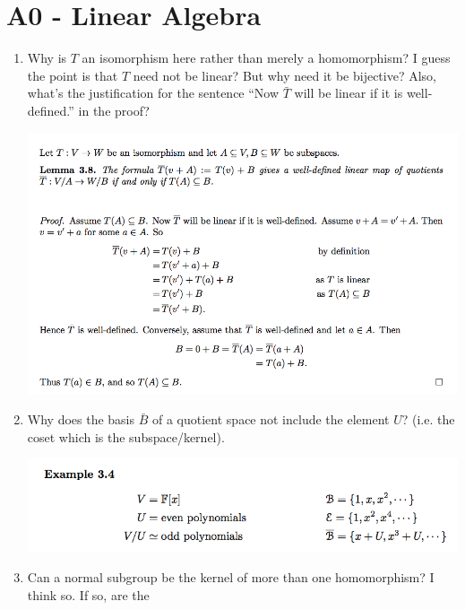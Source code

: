 \documentclass[12pt]{article}
\begin{document}
\section{A0 - Linear Algebra}
\begin{enumerate}
\item Why is $T$ an isomorphism here rather than merely a homomorphism? I guess the point is that
  $T$ need not be linear? But why need it be bijective? Also, what's the justification for the
  sentence ``Now $\bar T$ will be linear if it is well-defined.'' in the proof?
  \begin{mdframed}
    \includegraphics[width=400pt]{img/question-linear-algebra-a0-induced-map-well-defined-theorem.png}
  \end{mdframed}
\item Why does the basis $\bar B$ of a quotient space not include the element $U$? (i.e. the coset
  which is the subspace/kernel).
  \begin{mdframed}
    \includegraphics[width=400pt]{img/question-linear-algebra-a0-basis-of-quotient-space.png}
  \end{mdframed}
\item Can a normal subgroup be the kernel of more than one homomorphism? I think so. If so, are the

\end{enumerate}
\end{document}
